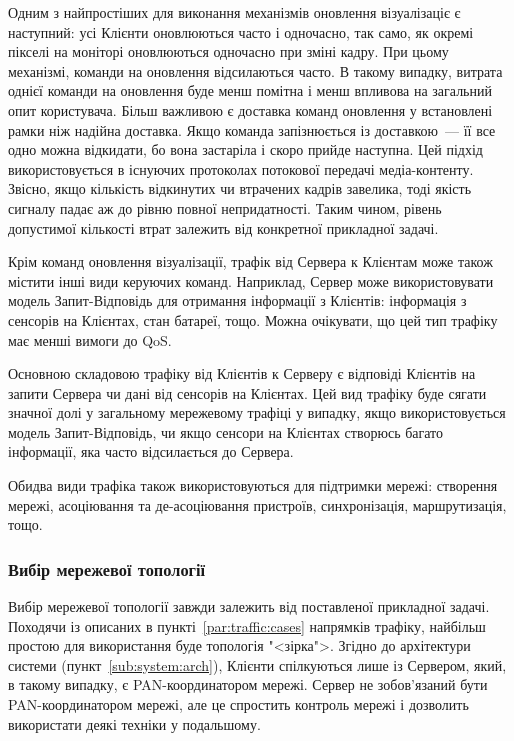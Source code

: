 \documentclass[a4paper,ukrainian,utf8,nocolumnsxix,floatsection,equationsection]{eskdtext}
\renewcommand\paragraph{\subsubsection}
\begin{document}
Одним з найпростіших для виконання механізмів оновлення візуалізаціє є наступний: усі Клієнти оновлюються часто і одночасно, так само, як окремі пікселі на моніторі оновлюються одночасно при зміні кадру. При цьому механізмі, команди на оновлення відсилаються часто. В такому випадку, витрата однієї команди на оновлення буде менш помітна і менш впливова на загальний опит користувача. Більш важливою є доставка  команд оновлення у встановлені рамки ніж надійна доставка. Якщо команда запізнюється із доставкою~--- її все одно можна відкидати, бо вона застаріла і скоро прийде наступна. Цей підхід використовується в існуючих протоколах потокової передачі медіа-контенту. Звісно, якщо кількість відкинутих чи втрачених кадрів завелика, тоді якість сигналу падає аж до рівню повної непридатності. Таким чином, рівень допустимої кількості втрат залежить від конкретної прикладної задачі.

Крім команд оновлення візуалізації, трафік від Сервера к Клієнтам може також містити інші види керуючих команд. Наприклад, Сервер може використовувати модель Запит-Відповідь для отримання інформації з Клієнтів: інформація з сенсорів на Клієнтах, стан батареї, тощо. Можна очікувати, що цей тип трафіку має менші вимоги до QoS.

Основною складовою трафіку від Клієнтів к Серверу є відповіді Клієнтів на запити Сервера чи дані від сенсорів на Клієнтах. Цей вид трафіку буде сягати значної долі у загальному мережевому трафіці у випадку, якщо використовується модель Запит-Відповідь, чи якщо сенсори на Клієнтах створюсь багато інформації, яка часто відсилається до Сервера.

Обидва види трафіка також використовуються для підтримки мережі: створення мережі, асоціювання та де-асоціювання пристроїв, синхронізація, маршрутизація, тощо.

\paragraph{Вибір мережевої топології}

Вибір мережевої топології завжди залежить від поставленої прикладної задачі. Походячи із описаних в пункті~\ref{par:traffic:cases} напрямків трафіку, найбільш простою для використання буде топологія "<зірка">. Згідно до архітектури системи (пункт~\ref{sub:system:arch}), Клієнти спілкуються лише із Сервером, який, в такому випадку, є PAN-координатором мережі. Сервер не зобов’язаний бути PAN-координатором мережі, але це спростить контроль мережі і дозволить використати деякі техніки у подальшому.
\end{document}
